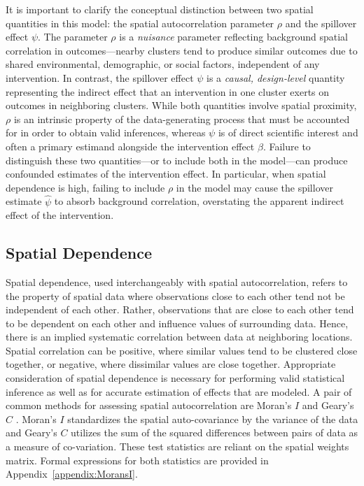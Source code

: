 \documentclass{article}[11pt]
\begin{document}
It is important to clarify the conceptual distinction between two spatial quantities in this model: the spatial autocorrelation parameter $\rho$ and the spillover effect $\psi$. The parameter $\rho$ is a \emph{nuisance} parameter reflecting background spatial correlation in outcomes---nearby clusters tend to produce similar outcomes due to shared environmental, demographic, or social factors, independent of any intervention. In contrast, the spillover effect $\psi$ is a \emph{causal, design-level} quantity representing the indirect effect that an intervention in one cluster exerts on outcomes in neighboring clusters. While both quantities involve spatial proximity, $\rho$ is an intrinsic property of the data-generating process that must be accounted for in order to obtain valid inferences, whereas $\psi$ is of direct scientific interest and often a primary estimand alongside the intervention effect $\beta$. Failure to distinguish these two quantities---or to include both in the model---can produce confounded estimates of the intervention effect. In particular, when spatial dependence is high, failing to include $\rho$ in the model may cause the spillover estimate $\hat{\psi}$ to absorb background correlation, overstating the apparent indirect effect of the intervention.

\subsection{Spatial Dependence}\label{section:SpatialWeightsMatrix}

Spatial dependence, used interchangeably with spatial autocorrelation, refers to the property of spatial data where observations close to each other tend not be independent of each other. Rather, observations that are close to each other tend to be dependent on each other and influence values of surrounding data. Hence, there is an implied systematic correlation between data at neighboring locations. Spatial correlation can be positive, where similar values tend to be clustered close together, or negative, where dissimilar values are close together. Appropriate consideration of spatial dependence is necessary for performing valid statistical inference as well as for accurate estimation of effects that are modeled. A pair of common methods for assessing spatial autocorrelation are Moran's $\textit{I}$ \cite{moran_interpretation_1948}\cite{moran_notes_1950} and Geary's $\textit{C}$ \cite{geary_contiguity_1954}\cite{waller_applied_2004}. Moran's $\textit{I}$ standardizes the spatial auto-covariance by the variance of the data and Geary's $\textit{C}$ utilizes the sum of the squared differences between pairs of data as a measure of co-variation. These test statistics are reliant on the spatial weights matrix. Formal expressions for both statistics are provided in Appendix~\ref{appendix:MoransI}.
\end{document}
